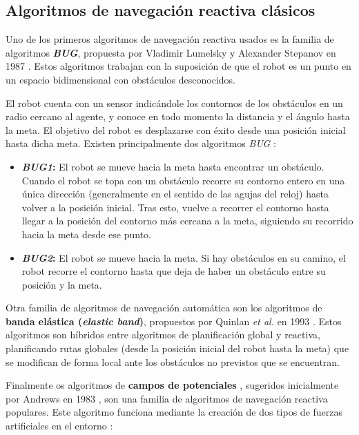 \subsection{Algoritmos de navegación reactiva clásicos}

Uno de los primeros algoritmos de navegación reactiva usados es la familia de algoritmos \textbf{\textit{BUG}}, propuesta por Vladimir Lumelsky y Alexander Stepanov en 1987 \cite{journals/algorithmica/LumelskyS87}. Estos algoritmos trabajan con la suposición de que el robot es un punto en un espacio bidimensional con obstáculos desconocidos. 

El robot cuenta con un sensor indicándole los contornos de los obstáculos en un radio cercano al agente, y conoce en todo momento la distancia y el ángulo hasta la meta. El objetivo del robot es desplazarse con éxito desde una posición inicial hasta dicha meta. Existen principalmente dos algoritmos \textit{BUG} \cite{lavalle:2006}:
\begin{itemize}
	\item \textbf{\textit{BUG1}:} El robot se mueve hacia la meta hasta encontrar un obstáculo. Cuando el robot se topa con un obstáculo recorre su contorno entero en una única dirección (generalmente en el sentido de las agujas del reloj) hasta volver a la posición inicial. Tras esto, vuelve a recorrer el contorno hasta llegar a la posición del contorno más cercana a la meta, siguiendo su recorrido hacia la meta desde ese punto.
	\item \textbf{\textit{BUG2}:} El robot se mueve hacia la meta. Si hay obstáculos en su camino, el robot recorre el contorno hasta que deja de haber un obstáculo entre su posición y la meta.
\end{itemize}

Otra familia de algoritmos de navegación automática son los algoritmos de \textbf{banda elástica (\textit{elastic band})}, propuestos por Quinlan \textit{et al.} en 1993 \cite{291936}. Estos algoritmos son híbridos entre algoritmos de planificación global y reactiva, planificando rutas globales (desde la posición inicial del robot hasta la meta) que se modifican de forma local ante los obstáculos no previstos que se encuentran.

Finalmente os algoritmos de \textbf{campos de potenciales} \cite{131810}, sugeridos inicialmente por Andrews en 1983 \cite{andrews1983impedance}, son una familia de algoritmos de navegación reactiva populares. Este algoritmo funciona mediante la creación de dos tipos de fuerzas artificiales en el entorno \cite{131810}:

